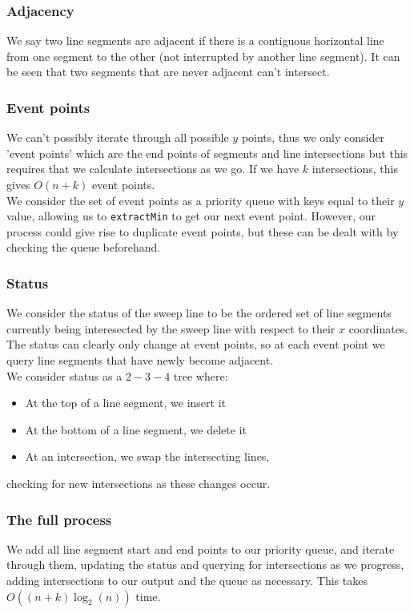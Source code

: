 \documentclass[a4paper, 12pt, twoside]{article}
\begin{document}
\subsubsection{Adjacency} 
We say two line segments are adjacent if there is a
contiguous horizontal line from one segment to the other (not interrupted
by another line segment). It can be
seen that two segments that are never adjacent can't intersect.

\subsubsection{Event points} 
We can't possibly iterate through all possible $y$
points, thus we only consider 'event points' which are the end points of 
segments and line intersections but this requires that we calculate 
intersections as we go. If we have $k$ intersections,
this gives $O(n + k)$ event points.
\\[\baselineskip]
We consider the set of event points as a priority queue with keys 
equal to their $y$ value, allowing us to \texttt{extractMin} to get
our next event point. However, our process could give rise to duplicate
event points, but these can be dealt with by checking the queue beforehand.

\subsubsection{Status} 
We consider the status of the sweep line to be the
ordered set of line segments currently being interesected by the sweep line
with respect to their $x$ coordinates. The status can clearly only change
at event points, so at each event point we query line segments that have
newly become adjacent.
\\[\baselineskip]
We consider status as a $2-3-4$ tree where: \begin{itemize}
  \item At the top of a line segment, we insert it
  \item At the bottom of a line segment, we delete it
  \item At an intersection, we swap the intersecting lines,
\end{itemize} checking for new intersections as these changes occur.

\subsubsection{The full process}

We add all line segment start and end points to our priority queue, and
iterate through them, updating the status and querying for intersections as
we progress, adding intersections to our output and the queue as necessary.
This takes \newline $O((n + k)\log_2(n))$ time.
\end{document}

